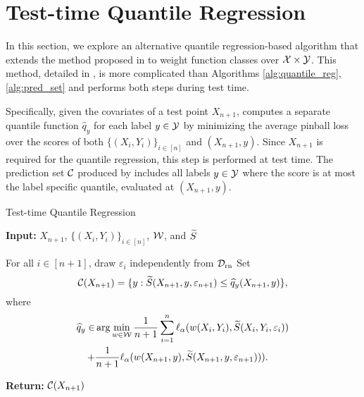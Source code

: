 \section{Test-time Quantile Regression}
\label{sec:testtimeqr}

In this section, we explore an alternative quantile regression-based algorithm that extends the method proposed in \cite{GCC2023} to weight function classes over ${\cal X} \times {\cal Y}$. This method, detailed in , is more complicated than Algorithms \ref{alg:quantile_reg}, \ref{alg:pred_set} and performs both steps during test time.

Specifically, given the covariates of a test point $X_{n+1}$,  computes a separate quantile function $\hat{q}_y$ for each label $y \in {\cal Y}$ by minimizing the average pinball loss over the scores of both $\{(X_{i},Y_{i})\}_{i \in [n]}$ and $(X_{n+1},y)$. Since $X_{n+1}$ is required for the quantile regression, this step is performed at test time. The prediction set ${\cal C}$ produced by  includes all labels $y \in {\cal Y}$ where the score is at most the label specific quantile, evaluated at $(X_{n+1},y)$.

\begin{algorithm}
\caption{Test-time Quantile Regression}
\label{alg:tt_quantile_reg}
\textbf{Input:} $X_{n+1}$, $\{(X_i,Y_i)\}_{i \in [n]}$, ${\cal W}$, and ${\widetilde{S}}$\\

\begin{algorithmic}[1]
    \STATE For all $i \in [n+1]$, draw $\varepsilon_i$ independently from ${\cal D}_{\text{rn}}$
    \STATE Set
    $$
        {\cal C}(X_{n+1}) = \{y:{\widetilde{S}}(X_{n+1},y, \varepsilon_{n+1}) \leq \widehat{q}_y(X_{n+1},y)\},
    $$
     where
    \begin{align*}
        \widehat{q}_y \in &\arg \min_{w \in {\cal W}} \frac{1}{n+1} \sum_{i=1}^n \ell_\alpha (w(X_i,Y_i),{\widetilde{S}}(X_i,Y_i, \varepsilon_i)) \\
    + &\frac{1}{n+1} \ell_\alpha (w(X_{n+1},y),{\widetilde{S}}(X_{n+1},y, \varepsilon_{n+1}))).
    \end{align*}
\end{algorithmic}
\textbf{Return:} ${\cal C}(X_{n+1})$
\end{algorithm}

\begin{comment}
\begin{align}
    \hat{q}_y \coloneqq \arg \min_{w \in \calW} &\frac{1}{n+1} \sum_{i=1}^n \ell_\alpha (w(X_i,Y_i),\tS(S(X_i,Y_i), \varepsilon_i)) \\
    + &\frac{1}{n+1} \ell_\alpha (w(X_{n+1},y),\tS(S(X_{n+1},y), \varepsilon_{n+1}))
\end{align}
\begin{align}
    \calC_{\text{t}}(X_{n+1}) \coloneqq \{y:\tS(S(X_{n+1},y), \varepsilon_{n+1}) \leq \hat{q}_y(X_{n+1},y)\}
    \label{eq:test_time_pred_set}
\end{align}
\end{comment}

